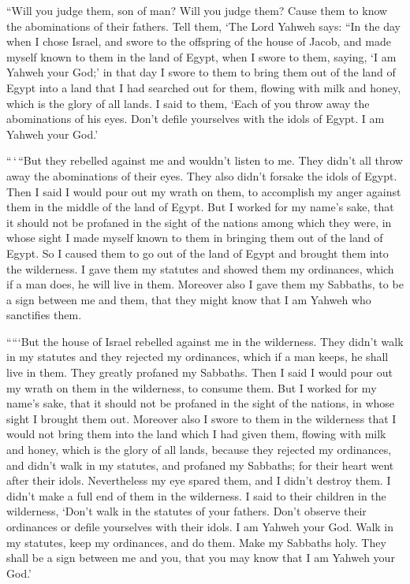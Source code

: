  ``Will you judge them, son of man? Will you judge them?
Cause them to know the abominations of their fathers.  Tell
them, `The Lord Yahweh says: ``In the day when I chose Israel, and swore
to the offspring of the house of Jacob, and made myself known to them in
the land of Egypt, when I swore to them, saying, `I am Yahweh your God;'
 in that day I swore to them to bring them out of the land
of Egypt into a land that I had searched out for them, flowing with milk
and honey, which is the glory of all lands.  I said to them,
`Each of you throw away the abominations of his eyes. Don't defile
yourselves with the idols of Egypt. I am Yahweh your God.'

 ``\,`\,``But they rebelled against me and wouldn't listen
to me. They didn't all throw away the abominations of their eyes. They
also didn't forsake the idols of Egypt. Then I said I would pour out my
wrath on them, to accomplish my anger against them in the middle of the
land of Egypt.  But I worked for my name's sake, that it
should not be profaned in the sight of the nations among which they
were, in whose sight I made myself known to them in bringing them out of
the land of Egypt.  So I caused them to go out of the land
of Egypt and brought them into the wilderness.  I gave them
my statutes and showed them my ordinances, which if a man does, he will
live in them.  Moreover also I gave them my Sabbaths, to be
a sign between me and them, that they might know that I am Yahweh who
sanctifies them.

 `````But the house of Israel rebelled against me in the
wilderness. They didn't walk in my statutes and they rejected my
ordinances, which if a man keeps, he shall live in them. They greatly
profaned my Sabbaths. Then I said I would pour out my wrath on them in
the wilderness, to consume them.  But I worked for my
name's sake, that it should not be profaned in the sight of the nations,
in whose sight I brought them out.  Moreover also I swore
to them in the wilderness that I would not bring them into the land
which I had given them, flowing with milk and honey, which is the glory
of all lands,  because they rejected my ordinances, and
didn't walk in my statutes, and profaned my Sabbaths; for their heart
went after their idols.  Nevertheless my eye spared them,
and I didn't destroy them. I didn't make a full end of them in the
wilderness.  I said to their children in the wilderness,
`Don't walk in the statutes of your fathers. Don't observe their
ordinances or defile yourselves with their idols.  I am
Yahweh your God. Walk in my statutes, keep my ordinances, and do them.
 Make my Sabbaths holy. They shall be a sign between me and
you, that you may know that I am Yahweh your God.'

